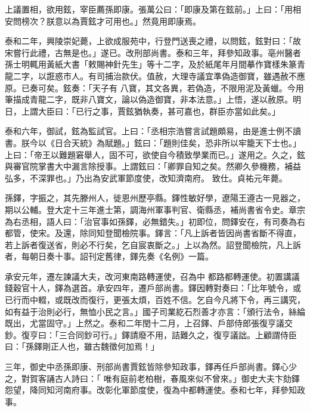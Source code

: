 \begin{pinyinscope}
 上議置相，欲用鉉，宰臣薦孫即康。張萬公曰：「即康及第在鉉前。」上曰：「用相安問榜次？朕意以為賈鉉才可用也。」然竟用即康焉。



 泰和二年，興陵崇妃薨，上欲成服苑中，行登門送喪之禮，以問鉉，鉉對曰：「故宋嘗行此禮，古無是也。」遂已。改刑部尚書。泰和三年，拜參知政事。亳州醫者孫士明輒用黃紙大書「敕賜神針先生」等十二字，及於紙尾年月間摹作寶樣朱篆青龍二字，以誑惑市人。有司捕治款伏。值赦，大理寺議宜準偽造御寶，雖遇赦不應原。已奏可矣。鉉奏：「天子有
 八寶，其文各異，若偽造，不限用泥及黃蠟。今用筆描成青龍二字，既非八寶文，論以偽造御寶，非本法意。」上悟，遂以赦原。明日，上謂大臣曰：「已行之事，賈鉉猶執奏，甚可嘉也，群臣亦當如此矣。」



 泰和六年，御試，鉉為監試官。上曰：「丞相宗浩嘗言試題頗易，由是進士例不讀書。朕今以《日合天統》為賦題。」鉉曰：「題則佳矣，恐非所以牢籠天下士也。」上曰：「帝王以難題窘舉人，固不可，欲使自今積致學業而已。」遂用之。久之，鉉與審官院掌書大中漏言除授事。上謂鉉曰：「卿罪自知之矣。然卿久參機務，補益弘多，不深罪也。」乃出為安武軍節度使，改知濟南府。
 致仕。貞祐元年薨。



 孫鐸，字振之，其先滕州人，徙恩州歷亭縣。鐸性敏好學，遼陽王遵古一見器之，期以公輔。登大定十三年進士第，調海州軍事判官、衛縣丞，補尚書省令史。章宗為右丞相，語人曰：「治官事如孫鐸，必無錯失。」初即位，問鐸安在，有司奏為右都管，使宋。及還，除同知登聞檢院事。鐸言：「凡上訴者皆因尚書省斷不得直，若上訴者復送省，則必不行矣，乞自宸衷斷之。」上以為然。詔登聞檢院，凡上訴者，每朝日奏十事。詔刊定舊律，鐸先奏《名例》一篇。



 承安元年，遷左諫議大夫，改河東南路轉運使，召為中
 都路都轉運使。初置講議錢穀官十人，鐸為選首。承安四年，遷戶部尚書。鐸因轉對奏曰：「比年號令，或已行而中輟，或既改而復行，更張太煩，百姓不信。乞自今凡將下令，再三講究，如有益于治則必行，無恤小民之言。」國子司業紇石烈善才亦言：「頒行法令，絲綸既出，尤當固守。」上然之。泰和二年閏十二月，上召鐸、戶部侍郎張復亨議交鈔。復亨曰：「三合同鈔可行。」鐸請廢不用，詰難久之，復亨議詘。上顧謂侍臣曰：「孫鐸剛正人也，雖古魏徵何加焉！」



 三年，御史中丞孫即康、刑部尚書賈鉉皆除參知政事，鐸再任戶部尚書。鐸心少之，對賀客誦古人詩曰：「
 唯有庭前老柏樹，春風來似不曾來。」御史大夫卞劾鐸怨望，降同知河南府事。改彰化軍節度使，復為中都轉運使。泰和七年，拜參知政事。




\end{pinyinscope}
